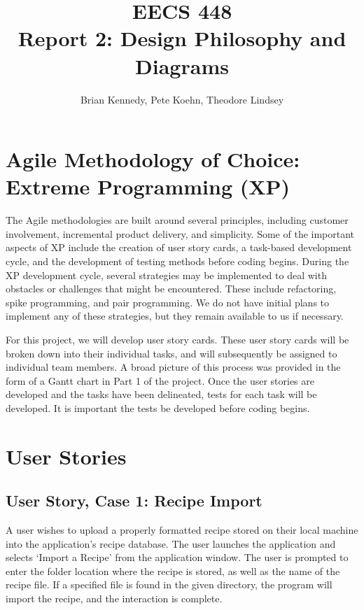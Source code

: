 \documentclass[landscape]{article}
\author{Brian Kennedy, Pete Koehn, Theodore Lindsey}
\title{EECS 448 \\ Report 2: Design Philosophy and Diagrams}
\begin{document}
\maketitle

\vfill

\tableofcontents

\newpage
\newpage

\section{Agile Methodology of Choice: Extreme Programming (XP)}

The Agile methodologies are built around several principles, including customer involvement, incremental product delivery, and simplicity. Some of the important aspects of XP include the creation of user story cards, a task-based development cycle, and the development of testing methods before coding begins. During the XP development cycle, several strategies may be implemented to deal with obstacles or challenges that might be encountered. These include refactoring, spike programming, and pair programming. We do not have initial plans to implement any of these strategies, but they remain available to us if necessary.

For this project, we will develop user story cards. These user story cards will be broken down into their individual tasks, and will subsequently be assigned to individual team members. A broad picture of this process was provided in the form of a Gantt chart in Part 1 of the project. Once the user stories are developed and the tasks have been delineated, tests for each task will be developed. It is important the tests be developed before coding begins.

\section{User Stories}
\subsection{User Story, Case 1: Recipe Import}

A user wishes to upload a properly formatted recipe stored on their local machine into the application's recipe database. The user launches the application and selects `Import a Recipe' from the application window. The user is prompted to enter the folder location where the recipe is stored, as well as the name of the recipe file. If a specified file is found in the given directory, the program will import the recipe, and the interaction is complete.
\end{document}
